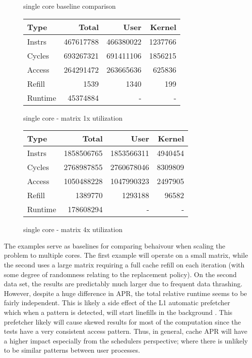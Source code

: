 \documentclass[11pt]{article}
\begin{document}
\begin{figure*}[!h]
	\caption{single core baseline comparison}
	\centering
	\begin{subtable}{.48\linewidth}
		\centering
		\begin{tabular}{ l|rrr }
			Type    & Total     & User      & Kernel  \\
			\hline
			Instrs  & 467617788 & 466380022 & 1237766 \\ 
			Cycles  & 693267321 & 691411106 & 1856215 \\ 
			Access  & 264291472 & 263665636 & 625836  \\ 
			Refill  & 1539      & 1340      & 199     \\ 
			Runtime & 45374884  & -         & -       \\ 
			\hline
		\end{tabular}
		\caption{single core - matrix 1x utilization}
	\end{subtable}
	\hfill
	\begin{subtable}{.48\linewidth}
		\centering
		\begin{tabular}{ l|rrr }
			Type    & Total      & User       & Kernel  \\
			\hline
			Instrs  & 1858506765 & 1853566311 & 4940454 \\ 
			Cycles  & 2768987855 & 2760678046 & 8309809 \\ 
			Access  & 1050488228 & 1047990323 & 2497905 \\ 
			Refill  & 1389770    & 1293188    & 96582   \\ 
			Runtime & 178608294  & -          & -       \\ 
			\hline
		\end{tabular}
		\caption{single core - matrix 4x utilization}
	\end{subtable}
\end{figure*}

The examples serve as baselines for comparing behaivour when scaling the problem to multiple cores.  The first example will operate on a small matrix, while the second uses a large matrix requiring a full cache refill on each iteration (with some degree of randomness relating to the replacement policy).  On the second data set, the results are predictably much larger due to frequent data thrashing.  However, despite a huge difference in APR, the total relative runtime seems to be fairly independent.  This is likely a side effect of the L1 automatic prefetcher which when a pattern is detected, will start linefills in the background \cite{arm-l1-prefetch}.  This prefetcher likely will cause skewed results for most of the computation since the tests have a very consistent access pattern.  Thus, in general, cache APR will have a higher impact especially from the schedulers perspective; where there is unlikely to be similar patterns between user processes.
\end{document}
